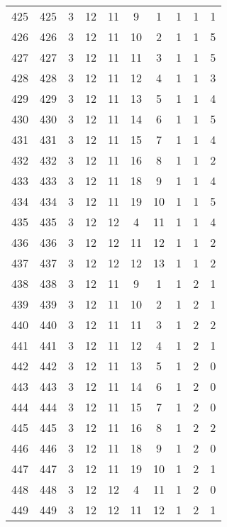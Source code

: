 \begin{longtable}{cccccccccc}
  425 & 425 &   3 &  12 &  11 &   9 &   1 &   1 &   1 &   1 \\ 
  426 & 426 &   3 &  12 &  11 &  10 &   2 &   1 &   1 &   5 \\ 
  427 & 427 &   3 &  12 &  11 &  11 &   3 &   1 &   1 &   5 \\ 
  428 & 428 &   3 &  12 &  11 &  12 &   4 &   1 &   1 &   3 \\ 
  429 & 429 &   3 &  12 &  11 &  13 &   5 &   1 &   1 &   4 \\ 
  430 & 430 &   3 &  12 &  11 &  14 &   6 &   1 &   1 &   5 \\ 
  431 & 431 &   3 &  12 &  11 &  15 &   7 &   1 &   1 &   4 \\ 
  432 & 432 &   3 &  12 &  11 &  16 &   8 &   1 &   1 &   2 \\ 
  433 & 433 &   3 &  12 &  11 &  18 &   9 &   1 &   1 &   4 \\ 
  434 & 434 &   3 &  12 &  11 &  19 &  10 &   1 &   1 &   5 \\ 
  435 & 435 &   3 &  12 &  12 &   4 &  11 &   1 &   1 &   4 \\ 
  436 & 436 &   3 &  12 &  12 &  11 &  12 &   1 &   1 &   2 \\ 
  437 & 437 &   3 &  12 &  12 &  12 &  13 &   1 &   1 &   2 \\ 
  438 & 438 &   3 &  12 &  11 &   9 &   1 &   1 &   2 &   1 \\ 
  439 & 439 &   3 &  12 &  11 &  10 &   2 &   1 &   2 &   1 \\ 
  440 & 440 &   3 &  12 &  11 &  11 &   3 &   1 &   2 &   2 \\ 
  441 & 441 &   3 &  12 &  11 &  12 &   4 &   1 &   2 &   1 \\ 
  442 & 442 &   3 &  12 &  11 &  13 &   5 &   1 &   2 &   0 \\ 
  443 & 443 &   3 &  12 &  11 &  14 &   6 &   1 &   2 &   0 \\ 
  444 & 444 &   3 &  12 &  11 &  15 &   7 &   1 &   2 &   0 \\ 
  445 & 445 &   3 &  12 &  11 &  16 &   8 &   1 &   2 &   2 \\ 
  446 & 446 &   3 &  12 &  11 &  18 &   9 &   1 &   2 &   0 \\ 
  447 & 447 &   3 &  12 &  11 &  19 &  10 &   1 &   2 &   1 \\ 
  448 & 448 &   3 &  12 &  12 &   4 &  11 &   1 &   2 &   0 \\ 
  449 & 449 &   3 &  12 &  12 &  11 &  12 &   1 &   2 &   1 \\ 

\end{longtable}
